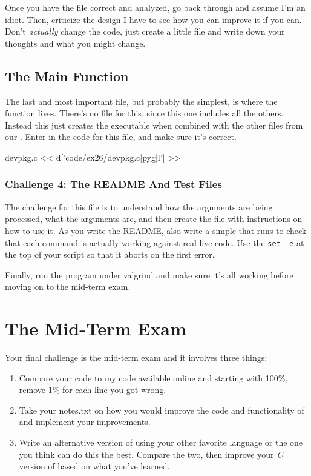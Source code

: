 Once you have the file correct and analyzed, go back through and assume
I'm an idiot.  Then, criticize the design I have to see how you can improve
it if you can.  Don't \emph{actually} change the code, just create a little
 file and write down your thoughts and what you might change.


\subsection{The  Main Function}

The last and most important file, but probably the simplest, is 
where the  function lives.  There's no  file for this, since
this one includes all the others.  Instead this just creates the executable
 when combined with the other  files from our 
.  Enter in the code for this file, and make sure it's 
correct.

\begin{code}{devpkg.c}
<< d['code/ex26/devpkg.c|pyg|l'] >>
\end{code}

\subsubsection{Challenge 4: The README And Test Files}

The challenge for this file is to understand how the arguments are
being processed, what the arguments are, and then create the 
file with instructions on how to use it.  As you write the README, also
write a simple  that runs  to check that
each command is actually working against real live code.  Use the \verb|set -e|
at the top of your script so that it aborts on the first error.

Finally, run the program under valgrind and make sure it's all working
before moving on to the mid-term exam.

\section{The Mid-Term Exam}

Your final challenge is the mid-term exam and it involves three things:

\begin{enumerate}
\item Compare your code to my code available online and starting with 100\%, 
    remove 1\% for each line you got wrong.
\item Take your notes.txt on how you would improve the code and functionality
    of  and implement your improvements.
\item Write an alternative version of  using your other 
    favorite language or the one you think can do this the best.  Compare
    the two, then improve your \emph{C} version of  based on what
    you've learned.
\end{enumerate}

